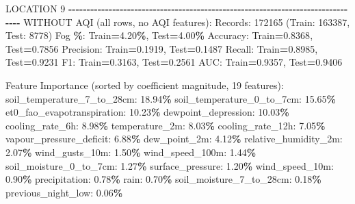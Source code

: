 \documentclass[
  letterpaper,
  DIV=11,
  numbers=noendperiod]{scrartcl}
\newenvironment{Shaded}{\begin{snugshade}}{\end{snugshade}}
\newcommand{\BuiltInTok}[1]{#1}
\newcommand{\DecValTok}[1]{\textcolor[rgb]{0.00,0.00,0.81}{#1}}
\newcommand{\FloatTok}[1]{\textcolor[rgb]{0.00,0.00,0.81}{#1}}
\newcommand{\NormalTok}[1]{#1}
\newcommand{\OperatorTok}[1]{\textcolor[rgb]{0.81,0.36,0.00}{\textbf{#1}}}
\begin{document}
\begin{Shaded}
\begin{Highlighting}[]
\NormalTok{LOCATION }\DecValTok{9}
\OperatorTok{{-}{-}{-}{-}{-}{-}{-}{-}{-}{-}{-}{-}{-}{-}{-}{-}{-}{-}{-}{-}{-}{-}{-}{-}{-}{-}{-}{-}{-}{-}{-}{-}{-}{-}{-}{-}{-}{-}{-}{-}{-}{-}{-}{-}{-}{-}{-}{-}{-}{-}{-}{-}{-}{-}{-}{-}{-}{-}{-}{-}{-}{-}{-}{-}{-}{-}{-}{-}{-}{-}{-}{-}{-}{-}{-}{-}{-}{-}{-}{-}}
\NormalTok{WITHOUT AQI (}\BuiltInTok{all}\NormalTok{ rows, no AQI features):}
\NormalTok{  Records: }\DecValTok{172165}\NormalTok{ (Train: }\DecValTok{163387}\NormalTok{, Test: }\DecValTok{8778}\NormalTok{)}
\NormalTok{  Fog }\OperatorTok{\%}\NormalTok{: Train}\OperatorTok{=}\FloatTok{4.20}\OperatorTok{\%}\NormalTok{, Test}\OperatorTok{=}\FloatTok{4.00}\OperatorTok{\%}
\NormalTok{  Accuracy: Train}\OperatorTok{=}\FloatTok{0.8368}\NormalTok{, Test}\OperatorTok{=}\FloatTok{0.7856}
\NormalTok{  Precision: Train}\OperatorTok{=}\FloatTok{0.1919}\NormalTok{, Test}\OperatorTok{=}\FloatTok{0.1487}
\NormalTok{  Recall: Train}\OperatorTok{=}\FloatTok{0.8985}\NormalTok{, Test}\OperatorTok{=}\FloatTok{0.9231}
\NormalTok{  F1: Train}\OperatorTok{=}\FloatTok{0.3163}\NormalTok{, Test}\OperatorTok{=}\FloatTok{0.2561}
\NormalTok{  AUC: Train}\OperatorTok{=}\FloatTok{0.9357}\NormalTok{, Test}\OperatorTok{=}\FloatTok{0.9406}

\NormalTok{  Feature Importance (}\BuiltInTok{sorted}\NormalTok{ by coefficient magnitude, }\DecValTok{19}\NormalTok{ features):}
\NormalTok{    soil\_temperature\_7\_to\_28cm: }\FloatTok{18.94}\OperatorTok{\%}
\NormalTok{    soil\_temperature\_0\_to\_7cm: }\FloatTok{15.65}\OperatorTok{\%}
\NormalTok{    et0\_fao\_evapotranspiration: }\FloatTok{10.23}\OperatorTok{\%}
\NormalTok{    dewpoint\_depression: }\FloatTok{10.03}\OperatorTok{\%}
\NormalTok{    cooling\_rate\_6h: }\FloatTok{8.98}\OperatorTok{\%}
\NormalTok{    temperature\_2m: }\FloatTok{8.03}\OperatorTok{\%}
\NormalTok{    cooling\_rate\_12h: }\FloatTok{7.05}\OperatorTok{\%}
\NormalTok{    vapour\_pressure\_deficit: }\FloatTok{6.88}\OperatorTok{\%}
\NormalTok{    dew\_point\_2m: }\FloatTok{4.12}\OperatorTok{\%}
\NormalTok{    relative\_humidity\_2m: }\FloatTok{2.07}\OperatorTok{\%}
\NormalTok{    wind\_gusts\_10m: }\FloatTok{1.50}\OperatorTok{\%}
\NormalTok{    wind\_speed\_100m: }\FloatTok{1.44}\OperatorTok{\%}
\NormalTok{    soil\_moisture\_0\_to\_7cm: }\FloatTok{1.27}\OperatorTok{\%}
\NormalTok{    surface\_pressure: }\FloatTok{1.20}\OperatorTok{\%}
\NormalTok{    wind\_speed\_10m: }\FloatTok{0.90}\OperatorTok{\%}
\NormalTok{    precipitation: }\FloatTok{0.78}\OperatorTok{\%}
\NormalTok{    rain: }\FloatTok{0.70}\OperatorTok{\%}
\NormalTok{    soil\_moisture\_7\_to\_28cm: }\FloatTok{0.18}\OperatorTok{\%}
\NormalTok{    previous\_night\_low: }\FloatTok{0.06}\OperatorTok{\%}


\end{Highlighting}
\end{Shaded}
\end{document}
